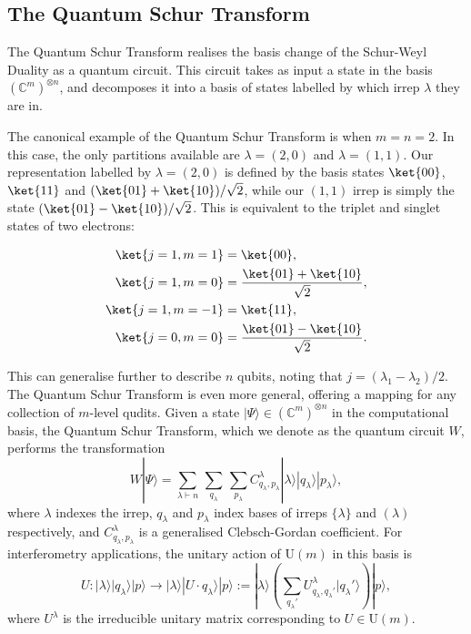 \subsection{The Quantum Schur Transform}

The Quantum Schur Transform realises the basis change of the Schur-Weyl Duality as a quantum circuit. This circuit takes as input a state in the basis $(\mathbb{C}^m)^{\otimes n}$, and decomposes it into a basis of states labelled by which irrep $\lambda$ they are in.

The canonical example of the Quantum Schur Transform is when $m=n=2$. In this case, the only partitions available are $\lambda=(2,0)$ and $\lambda=(1,1)$. Our representation labelled by $\lambda=(2,0)$ is defined by the basis states $\ket{00}$, $\ket{11}$ and $(\ket{01}+\ket{10})/\sqrt{2}$, while our $(1,1)$ irrep is simply the state $(\ket{01}-\ket{10})/\sqrt{2}$. This is equivalent to the triplet and singlet states of two electrons:

\begin{align}
\ket{j=1,m=1} &= \ket{00},\\
\ket{j=1,m=0} &= \frac{\ket{01}+\ket{10}}{\sqrt{2}},\\
\ket{j=1,m=-1} &= \ket{11},\\
\ket{j=0,m=0} &= \frac{\ket{01}-\ket{10}}{\sqrt{2}}.
\end{align}

This can generalise further to describe $n$ qubits, noting that $j=(\lambda_1-\lambda_2)/2$. The Quantum Schur Transform is even more general, offering a mapping for any collection of $m$-level qudits. Given a state $|\Psi\rangle \in (\mathbb{C}^m)^{\otimes n}$ in the computational basis, the Quantum Schur Transform, which we denote as the quantum circuit $W$, performs the transformation
\begin{equation}
W|\Psi\rangle
 = \sum_{\lambda \vdash n} \, \sum_{q_{\lambda}} \, \sum_{p_\lambda}C^\lambda_{q_\lambda,p_\lambda}|\lambda\rangle|q_\lambda\rangle|p_\lambda\rangle , 
\end{equation}
where $\lambda$ indexes the irrep, $q_\lambda$ and $p_\lambda$ index bases of irreps $\{\lambda\}$ and $(\lambda)$ respectively, and $C^\lambda_{q_\lambda,p_\lambda}$ is a generalised Clebsch-Gordan coefficient.
For interferometry applications, the unitary action of U$(m)$ in this basis is
\begin{equation}
U : |\lambda\rangle |q_\lambda\rangle |p\rangle \rightarrow |\lambda\rangle |U\cdot q_\lambda\rangle |p\rangle := |\lambda\rangle \left( \sum_{q_\lambda'} U^\lambda_{q_\lambda, q_\lambda'} |q_\lambda'\rangle \right) |p\rangle ,
\end{equation}
where $U^\lambda$ is the irreducible unitary matrix corresponding to $U \in \mathrm{U}(m)$.

